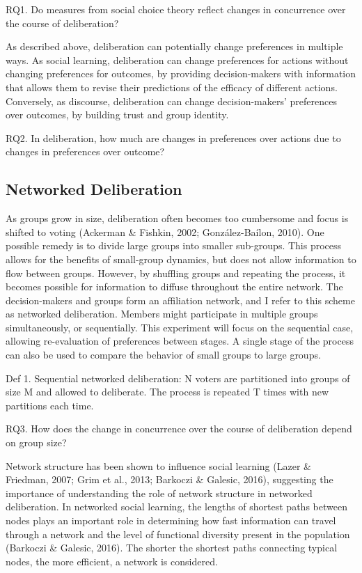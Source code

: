 RQ1. Do measures from social choice theory reflect changes in concurrence over the course of deliberation?

As described above, deliberation can potentially change preferences in multiple ways. As social learning, deliberation can change preferences for actions without changing preferences for outcomes, by providing decision-makers with information that allows them to revise their predictions of the efficacy of different actions. Conversely, as discourse, deliberation can change decision-makers’ preferences over outcomes, by building trust and group identity.

RQ2. In deliberation, how much are changes in preferences over actions due to changes in preferences over outcome?

\subsection{Networked Deliberation}
As groups grow in size, deliberation often becomes too cumbersome and focus is shifted to voting (Ackerman \& Fishkin, 2002; Gonz\'alez-Ba\'ilon, 2010). One possible remedy is to divide large groups into smaller sub-groups. This process allows for the benefits of small-group dynamics, but does not allow information to flow between groups. However, by shuffling groups and repeating the process, it becomes possible for information to diffuse throughout the entire network. The decision-makers and groups form an affiliation network, and I refer to this scheme as networked deliberation. Members might participate in multiple groups simultaneously, or sequentially. This experiment will focus on the sequential case, allowing re-evaluation of preferences between stages. A single stage of the process can also be used to compare the behavior of small groups to large groups.

Def 1. Sequential networked deliberation: N voters are partitioned into groups of size M and allowed to deliberate. The process is repeated T times with new partitions each time.

RQ3. How does the change in concurrence over the course of deliberation depend on group size?

Network structure has been shown to influence social learning (Lazer \& Friedman, 2007; Grim et al., 2013; Barkoczi \& Galesic, 2016), suggesting the importance of understanding the role of network structure in networked deliberation. In networked social learning, the lengths of shortest paths between nodes plays an important role in determining how fast information can travel through a network and the level of functional diversity present in the population (Barkoczi \& Galesic, 2016). The shorter the shortest paths connecting typical nodes, the more efficient, a network is considered.

